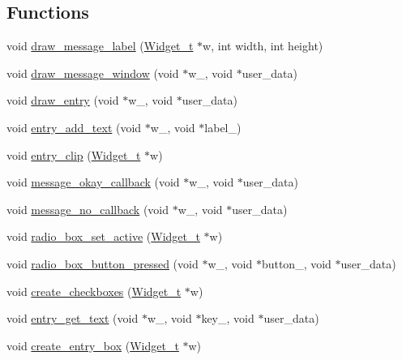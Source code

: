\subsection*{Functions}
\begin{DoxyCompactItemize}
\item 
void \hyperlink{xmessage-dialog_8c_a13791f31a218820c14db8b2280318e3b}{draw\+\_\+message\+\_\+label} (\hyperlink{structWidget__t}{Widget\+\_\+t} $\ast$w, int width, int height)
\item 
void \hyperlink{xmessage-dialog_8c_a16429962fe3b32e5478777af8e98bc78}{draw\+\_\+message\+\_\+window} (void $\ast$w\+\_\+, void $\ast$user\+\_\+data)
\item 
void \hyperlink{xmessage-dialog_8c_a238c62545e95ade5e387b20b91d8401f}{draw\+\_\+entry} (void $\ast$w\+\_\+, void $\ast$user\+\_\+data)
\item 
void \hyperlink{xmessage-dialog_8c_afe4c5cef3e963dd8e5811a545528d196}{entry\+\_\+add\+\_\+text} (void $\ast$w\+\_\+, void $\ast$label\+\_\+)
\item 
void \hyperlink{xmessage-dialog_8c_a67a62d74335197e6e97d67e840922038}{entry\+\_\+clip} (\hyperlink{structWidget__t}{Widget\+\_\+t} $\ast$w)
\item 
void \hyperlink{xmessage-dialog_8c_acfeae33047e0af609881f04cda77ea09}{message\+\_\+okay\+\_\+callback} (void $\ast$w\+\_\+, void $\ast$user\+\_\+data)
\item 
void \hyperlink{xmessage-dialog_8c_a484a58cd0e5f4cf1ab8691930be42048}{message\+\_\+no\+\_\+callback} (void $\ast$w\+\_\+, void $\ast$user\+\_\+data)
\item 
void \hyperlink{xmessage-dialog_8c_ae2414db18fe2e55ea84644a15d1cd8ef}{radio\+\_\+box\+\_\+set\+\_\+active} (\hyperlink{structWidget__t}{Widget\+\_\+t} $\ast$w)
\item 
void \hyperlink{xmessage-dialog_8c_a8df87e5f315fc3bea96542839aa6c083}{radio\+\_\+box\+\_\+button\+\_\+pressed} (void $\ast$w\+\_\+, void $\ast$button\+\_\+, void $\ast$user\+\_\+data)
\item 
void \hyperlink{xmessage-dialog_8c_a6682a31112bb51c4b9e0f151fddcc280}{create\+\_\+checkboxes} (\hyperlink{structWidget__t}{Widget\+\_\+t} $\ast$w)
\item 
void \hyperlink{xmessage-dialog_8c_a57353ef900cad644662db3f519dcbd86}{entry\+\_\+get\+\_\+text} (void $\ast$w\+\_\+, void $\ast$key\+\_\+, void $\ast$user\+\_\+data)
\item 
void \hyperlink{xmessage-dialog_8c_a110c6755de1655565bc5d52f262e082d}{create\+\_\+entry\+\_\+box} (\hyperlink{structWidget__t}{Widget\+\_\+t} $\ast$w)

\end{DoxyCompactItemize}
